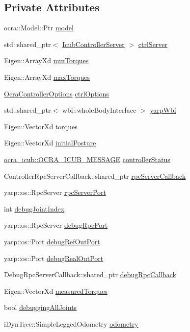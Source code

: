 \subsection*{Private Attributes}
\begin{DoxyCompactItemize}
\item 
ocra\+::\+Model\+::\+Ptr \hyperlink{classThread_a1dcef9aedc1a707e6f04d5fb6e4a0b13}{model}
\item 
std\+::shared\+\_\+ptr$<$ \hyperlink{classIcubControllerServer}{Icub\+Controller\+Server} $>$ \hyperlink{classThread_ace1179249de64e545f43dc48529fbbb6}{ctrl\+Server}
\item 
Eigen\+::\+Array\+Xd \hyperlink{classThread_a414015415c64371877d6028417c4f9e2}{min\+Torques}
\item 
Eigen\+::\+Array\+Xd \hyperlink{classThread_af28a4fcbbcbf77c42237c0be75a25a54}{max\+Torques}
\item 
\hyperlink{classOcraControllerOptions}{Ocra\+Controller\+Options} \hyperlink{classThread_af96a166364f0c6a680115600b3bd232e}{ctrl\+Options}
\item 
std\+::shared\+\_\+ptr$<$ wbi\+::whole\+Body\+Interface $>$ \hyperlink{classThread_aa3f4bbc2dca15c247a13de1bdbc4f7a3}{yarp\+Wbi}
\item 
Eigen\+::\+Vector\+Xd \hyperlink{classThread_a3238993799b36af06f3858a3f65dcf1e}{torques}
\item 
Eigen\+::\+Vector\+Xd \hyperlink{classThread_aa59863bb50c8aa88fe5872e75be44cb7}{initial\+Posture}
\item 
\hyperlink{namespaceocra__icub_afbd2db66b68005fb7cfac19210caf83f}{ocra\+\_\+icub\+::\+O\+C\+R\+A\+\_\+\+I\+C\+U\+B\+\_\+\+M\+E\+S\+S\+A\+GE} \hyperlink{classThread_a913cf23e86cdaefd036b782f7417254d}{controller\+Status}
\item 
Controller\+Rpc\+Server\+Callback\+::shared\+\_\+ptr \hyperlink{classThread_a602de8d12886c9c57b5420c83804a38b}{rpc\+Server\+Callback}
\item 
yarp\+::os\+::\+Rpc\+Server \hyperlink{classThread_adbec1b4f2c8fc40641df6f118e93fd25}{rpc\+Server\+Port}
\item 
int \hyperlink{classThread_aedf960b8e991868561f35193702245b0}{debug\+Joint\+Index}
\item 
yarp\+::os\+::\+Rpc\+Server \hyperlink{classThread_aa6b8f3712e7776d560b0a535eff73c34}{debug\+Rpc\+Port}
\item 
yarp\+::os\+::\+Port \hyperlink{classThread_a3780b51f82c50fd2738afbd0ae9b9526}{debug\+Ref\+Out\+Port}
\item 
yarp\+::os\+::\+Port \hyperlink{classThread_a9bd7f6aebc0be4709f32f95aa32f1add}{debug\+Real\+Out\+Port}
\item 
Debug\+Rpc\+Server\+Callback\+::shared\+\_\+ptr \hyperlink{classThread_a42833af67d5280e6946a31a03737e017}{debug\+Rpc\+Callback}
\item 
Eigen\+::\+Vector\+Xd \hyperlink{classThread_aa9cbe8744e51571a17fa726d8d16a0c6}{measured\+Torques}
\item 
bool \hyperlink{classThread_aba345996b91a57d9e1f2dd15c7c75e08}{debugging\+All\+Joints}
\item 
i\+Dyn\+Tree\+::\+Simple\+Legged\+Odometry \hyperlink{classThread_a23a41c6ccd1df898084112cfd46120f3}{odometry}
\end{DoxyCompactItemize}
